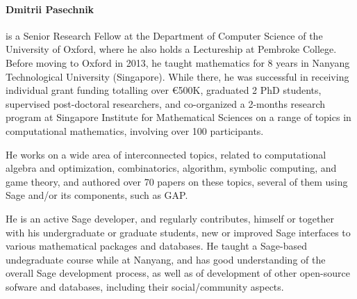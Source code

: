 \paragraph{Dmitrii Pasechnik}

%

%
is a Senior Research Fellow at the Department of Computer Science
of  the University of Oxford, where he also holds a Lectureship
at Pembroke College. Before moving to Oxford in 2013, he taught mathematics for 8
years in Nanyang Technological University (Singapore). While there, he
was successful in receiving individual grant funding totalling over \euro 500K, 
graduated 2 PhD students, supervised post-doctoral researchers, 
and co-organized a 2-months research program
at Singapore Institute for Mathematical Sciences
on a range of topics in computational mathematics, involving over 100 participants. 

He works on a wide area of interconnected topics, related to computational algebra
and optimization, combinatorics, algorithm, symbolic computing, and game theory, and authored over
70 papers on these topics, several of them using Sage and/or its components, such as GAP.

He is an active Sage developer, and regularly contributes, himself or together
with his undergraduate or graduate students, new or improved Sage interfaces to
various mathematical packages and databases. He taught a Sage-based
undegraduate course while at Nanyang, and has good understanding of the overall
Sage development process, as well as of development of other open-source
sofware and databases, including their social/community aspects. 
